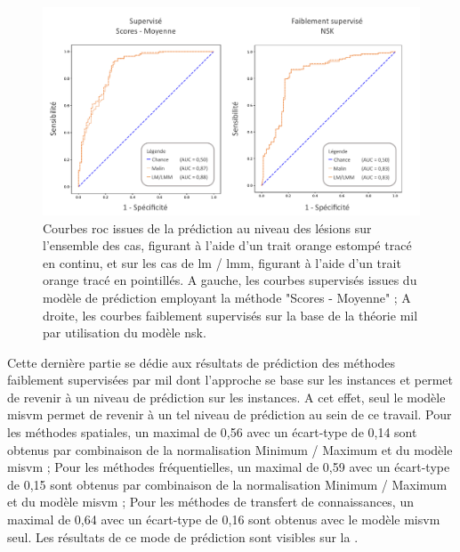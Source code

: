 \begin{figure}[H]
    \centering
    \includegraphics[width=\linewidth]{contents/chapter_7/resources/results_lesion_roc_lesions.pdf}
    \caption{Courbes \gls{roc} issues de la prédiction au niveau des lésions sur l'ensemble des cas, figurant à l'aide d'un trait orange estompé tracé en continu, et sur les cas de \gls{lm} / \gls{lmm}, figurant à l'aide d'un trait orange tracé en pointillés. A gauche, les courbes supervisés issues du modèle de prédiction employant la méthode "Scores - Moyenne" ; A droite, les courbes faiblement supervisés sur la base de la théorie \gls{mil} par utilisation du modèle \gls{nsk}.}
    \label{fig:results_lesion_roc_lesions}
\end{figure}\par

Cette dernière partie se dédie aux résultats de prédiction des méthodes faiblement supervisées par \gls{mil} dont l'approche se base sur les instances et permet de revenir à un niveau de prédiction sur les instances. A cet effet, seul le modèle \gls{misvm} permet de revenir à un tel niveau de prédiction au sein de ce travail. Pour les méthodes spatiales, un \fscore{} maximal de 0,56 avec un écart-type de 0,14 sont obtenus par combinaison de la normalisation Minimum / Maximum et du modèle \gls{misvm} ; Pour les méthodes fréquentielles, un \fscore{} maximal de 0,59 avec un écart-type de 0,15 sont obtenus par combinaison de la normalisation Minimum / Maximum et du modèle \gls{misvm} ; Pour les méthodes de transfert de connaissances, un \fscore{} maximal de 0,64 avec un écart-type de 0,16 sont obtenus avec le modèle \gls{misvm} seul. Les résultats de ce mode de prédiction sont visibles sur la .\par

